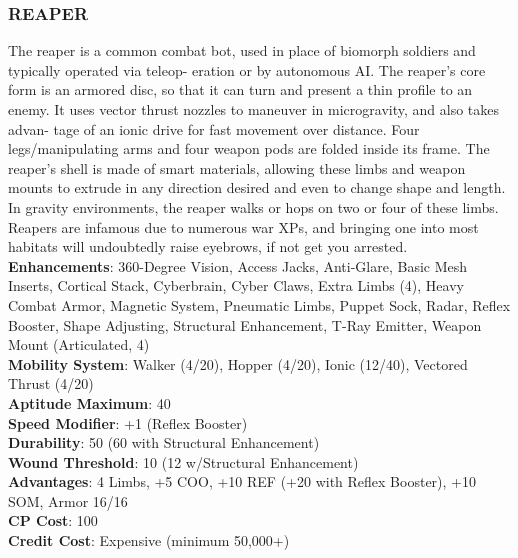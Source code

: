 \subsubsection{REAPER}
The reaper is a common combat bot, used in place of
biomorph soldiers and typically operated via teleop-
eration or by autonomous AI. The reaper’s core form
is an armored disc, so that it can turn and present a
thin profile to an enemy. It uses vector thrust nozzles
to maneuver in microgravity, and also takes advan-
tage of an ionic drive for fast movement over distance.
Four legs/manipulating arms and four weapon pods
are folded inside its frame. The reaper’s shell is made
of smart materials, allowing these limbs and weapon
mounts to extrude in any direction desired and even
to change shape and length. In gravity environments,
the reaper walks or hops on two or four of these limbs.
Reapers are infamous due to numerous war XPs, and
bringing one into most habitats will undoubtedly raise
eyebrows, if not get you arrested.
\\ \textbf{Enhancements}: 360-Degree Vision, Access Jacks,
Anti-Glare, Basic Mesh Inserts, Cortical Stack,
Cyberbrain, Cyber Claws, Extra Limbs (4), Heavy
Combat Armor, Magnetic System, Pneumatic Limbs,
Puppet Sock, Radar, Reflex Booster, Shape Adjusting,
Structural Enhancement, T-Ray Emitter, Weapon
Mount (Articulated, 4)
\\ \textbf{Mobility System}: Walker (4/20), Hopper (4/20), Ionic
(12/40), Vectored Thrust (4/20)
\\ \textbf{Aptitude Maximum}: 40
\\ \textbf{Speed Modifier}: +1 (Reflex Booster)
\\ \textbf{Durability}: 50 (60 with Structural Enhancement)
\\ \textbf{Wound Threshold}: 10 (12 w/Structural Enhancement)
\\ \textbf{Advantages}: 4 Limbs, +5 COO, +10 REF (+20 with
Reflex Booster), +10 SOM, Armor 16/16
\\ \textbf{CP Cost}: 100
\\ \textbf{Credit Cost}: Expensive (minimum 50,000+)

